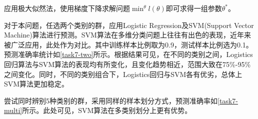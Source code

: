 \documentclass[a4paper,12pt]{article}
\begin{document}
    应用极大似然法，使用梯度下降求解问题$\min^{\theta} l(\theta)$即可求得一组参数$\theta^*$。

    对于本问题，任选两个类别的群，应用Logistic Regression及SVM(Support Vector Machine)算法进行预测。SVM算法在多维分类问题上往往有出色的表现，近年来被广泛应用，此处作为对比。其中训练样本比例取为0.9，测试样本比例选为0.1。预测准确率统计如\cref{task7-two}所示。根据结果可见，在不同的类别之间，Logistics回归算法与SVM算法的表现均有所变化，且变化趋势相近，范围大致在75\%-95\%之间变化。同时，不同的类别组合下，Logistics回归与SVM各有优劣，总体上SVM算法更加稳定。
    

    尝试同时辨别5种类别的群，采用同样的样本划分方式，预测准确率如\cref{task7-multi}所示。此处可见，SVM算法在多类别划分上更有优势。
    
    \label{applastpage}
    \newpage
    
    

\end{document}
